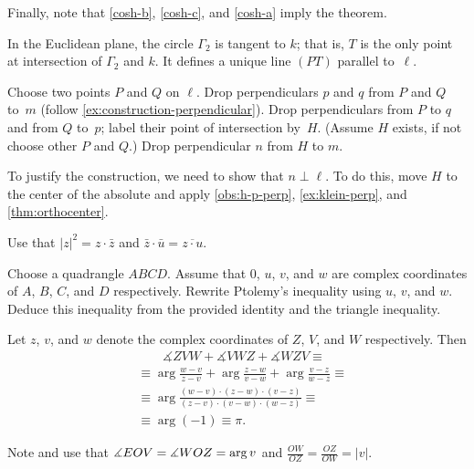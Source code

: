 Finally, note that \ref{cosh-b}, \ref{cosh-c}, and \ref{cosh-a} imply the theorem.

In the Euclidean plane, the circle $\Gamma_2$ is tangent to $k$; 
that is, $T$ is the only point at intersection of $\Gamma_2$ and $k$.
It defines a unique line $(PT)$ parallel to~$\ell$.

Choose two points $P$ and $Q$ on $\ell$.
Drop perpendiculars $p$ and $q$ from $P$ and $Q$ to~$m$
(follow \ref{ex:construction-perpendicular}).
Drop perpendiculars from $P$ to $q$ and from $Q$ to~$p$;
label their point of intersection by~$H$.
(Assume $H$ exists, if not choose other $P$ and $Q$.) 
Drop perpendicular $n$ from $H$ to $m$.

To justify the construction, we need to show that $n\perp \ell$.
To do this, move $H$ to the center of the absolute and apply \ref{obs:h-p-perp}, \ref{ex:klein-perp}, and \ref{thm:orthocenter}.

\setcounter{eqtn}{0}

 Use that $|z|^2=z\cdot \bar z$ and $\bar z\cdot \bar u=\overline{z\cdot u}$.

Choose a quadrangle $ABCD$.
Assume that $0$, $u$, $v$, and $w$ are complex coordinates of $A$, $B$, $C$, and $D$ respectively.
Rewrite Ptolemy's inequality using $u$, $v$, and $w$.
Deduce this inequality from the provided identity and the triangle inequality.


Let $z$, $v$, and $w$ denote the complex coordinates of $Z$, $V$, and $W$ respectively.
Then 
\begin{align*}
&\qquad \measuredangle ZVW+\measuredangle VWZ+\measuredangle WZV\equiv
\\
&\equiv
\arg \tfrac{w-v}{z-v}+\arg \tfrac{z-w}{v-w}+\arg \tfrac{v-z}{w-z}\equiv
\\
&\equiv
\arg \tfrac{(w-v)\cdot(z-w)\cdot(v-z)}{(z-v)\cdot(v-w)\cdot(w-z)}\equiv
\\
&\equiv\arg (-1)\equiv
\pi.
\end{align*}

Note and use that 
$
\measuredangle EOV=\measuredangle WOZ=\arg v$
and
$\frac{OW}{OZ}=\frac{OZ}{OW}=|v|$.



